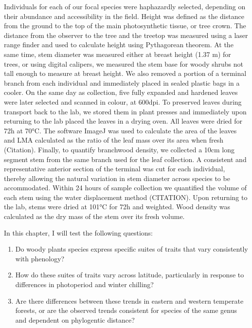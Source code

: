 \documentclass{article}\usepackage[]{graphicx}\usepackage[]{color}
\begin{document}
\par Individuals for each of our focal species were haphazardly selected, depending on their abundance and accessibility in the field. Height was defined as the distance from the ground to the top of the main photosynthetic tissue, or tree crown. The distance from the observer to the tree and the treetop was measured using a laser range finder and used to calculate height using Pythagorean theorem. At the same time, stem diameter was measured either at breast height (1.37 m) for trees, or using digital calipers, we measured the stem base for woody shrubs not tall enough to measure at breast height.  We also removed a portion of a terminal branch from each individual and immediately placed in sealed plastic bags in a cooler. On the same day as collection, five fully expanded and hardened leaves were later selected and scanned in colour, at 600dpi. To preserved leaves during transport back to the lab, we stored them in plant presses and immediately upon returning to the lab placed the leaves in a drying oven. All leaves were dried for 72h at 70°C. The software ImageJ was used to calculate the area of the leaves and LMA calculated as the ratio of the leaf mass over its area when fresh (Citation). Finally, to quantify branchwood density, we collected a 10cm long segment stem from the same branch used for the leaf collection. A consistent and representative anterior section of the terminal was cut for each individual, thereby allowing the natural variation in stem diameter across species to be accommodated. Within 24 hours of sample collection we quantified the volume of each stem using the water displacement method (CITATION). Upon returning to the lab, stems were dried at 101°C for 72h and weighted. Wood density was calculated as the dry mass of the stem over its fresh volume.  


\par In this chapter, I will test the following questions:
\begin{enumerate}
\item Do woody plants species express specific suites of traits that vary consistently with phenology? 
\item How do these suites of traits vary across latitude, particularly in response to differences in photoperiod and winter chilling?
\item Are there differences between these trends in eastern and western temperate forests, or are the observed trends consistent for species of the same genus and dependent on phylogentic distance?

\end{enumerate}
\par %
\end{document}

